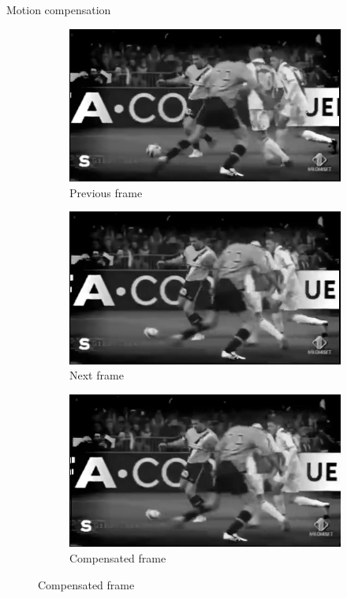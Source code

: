 \documentclass[aspectratio=1610,xcolor=dvipsnames]{beamer}
\begin{document}
\begin{frame}{Motion compensation}
    \begin{figure}[htbp]
        \begin{subfigure}[b]{0.3\textwidth}
            \centering
            \includegraphics[width=.9\textwidth]{images/dp-previous.png}
            \caption{Previous frame}
            \label{fig:dp-prev-frame}
        \end{subfigure}
        \hfill
        \begin{subfigure}[b]{0.3\textwidth}
            \includegraphics[width=.9\textwidth]{images/dp-current.png}
            \caption{Next frame}
            \label{fig:dp-curr-frame}
        \end{subfigure}
        \hfill
        \begin{subfigure}[b]{0.3\textwidth}
            \includegraphics[width=.9\textwidth]{images/dp-compensated.png}
            \caption{Compensated frame}
            \label{fig:dp-compensated}
        \end{subfigure}
        

\end{figure}
\end{frame}
\end{document}
